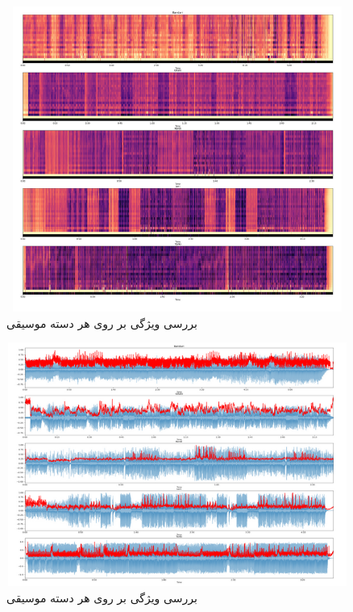 \documentclass[12pt,onecolumn,a4paper]{article}
\begin{document}
\begin{figure}
  \centering
  \includegraphics[width=14cm,height=10cm,keepaspectratio]{6.png}
  \caption{بررسی ویژگی  بر روی هر دسته موسیقی}
  \label{fig:MFCC}
\end{figure}

\begin{figure}
  \centering
  \includegraphics[width=12cm,height=8cm,keepaspectratio]{3.png}
  \caption{بررسی ویژگی  بر روی هر دسته موسیقی}
  \label{fig:SpectralCentroid}
\end{figure}
\end{document}
